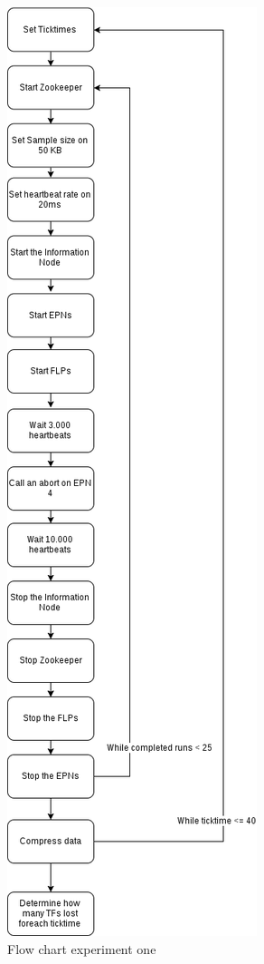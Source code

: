 \begin{figure}
    \centering
    \includegraphics[width=\textwidth,height=\textheight,keepaspectratio]{./graphics/ex1.png}
    \caption{Flow chart experiment one}
    \label{fig:FlowChart1}
\end{figure}

